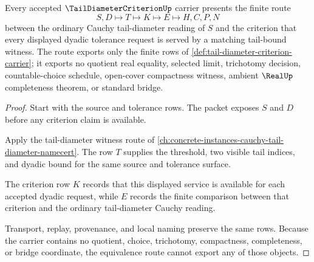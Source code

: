 \begin{theorem}
\label{thm:tail-diameter-criterion-cauchy-equivalence}
Every accepted $\TailDiameterCriterionUp$ carrier presents the finite route
$$
S,D \longmapsto T \longmapsto K \longmapsto E \longmapsto H,C,P,N
$$
between the ordinary Cauchy tail-diameter reading of $S$ and the criterion that every displayed dyadic tolerance request is served by a matching tail-bound witness. The route exports only the finite rows of \autoref{def:tail-diameter-criterion-carrier}; it exports no quotient real equality, selected limit, trichotomy decision, countable-choice schedule, open-cover compactness witness, ambient $\RealUp$ completeness theorem, or standard bridge.
\end{theorem}
\begin{proof}
Start with the source and tolerance rows. The packet exposes $S$ and $D$ before any criterion claim is available.

Apply the tail-diameter witness route of \autoref{ch:concrete-instances-cauchy-tail-diameter-namecert}. The row $T$ supplies the threshold, two visible tail indices, and dyadic bound for the same source and tolerance surface.

The criterion row $K$ records that this displayed service is available for each accepted dyadic request, while $E$ records the finite comparison between that criterion and the ordinary tail-diameter Cauchy reading.

Transport, replay, provenance, and local naming preserve the same rows. Because the carrier contains no quotient, choice, trichotomy, compactness, completeness, or bridge coordinate, the equivalence route cannot export any of those objects.
\end{proof}


